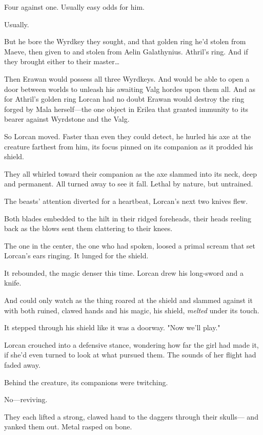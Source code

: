 Four against one. Usually easy odds for him.

Usually.

But he bore the Wyrdkey they sought, and that golden ring he'd stolen from Maeve, then given to and stolen from Aelin Galathynius. Athril's ring. And if they brought either to their master\ldots{}

Then Erawan would possess all three Wyrdkeys. And would be able to open a door between worlds to unleash his awaiting Valg hordes upon them all. And as for Athril's golden ring  Lorcan had no doubt Erawan would destroy the ring forged by Mala herself---the one object in Erilea that granted immunity to its bearer against Wyrdstone  and the Valg.

So Lorcan moved. Faster than even they could detect, he hurled his axe at the creature farthest from him, its focus pinned on its companion as it prodded his shield.

They all whirled toward their companion as the axe slammed into its neck, deep and permanent. All turned away to see it fall. Lethal by nature, but untrained.

The beasts' attention diverted for a heartbeat, Lorcan's next two knives flew.

Both blades embedded to the hilt in their ridged foreheads, their heads reeling back as the blows sent them clattering to their knees.

The one in the center, the one who had spoken, loosed a primal scream that set Lorcan's ears ringing. It lunged for the shield.

It rebounded, the magic denser this time. Lorcan drew his long-sword and a knife.

And could only watch as the thing roared at the shield and slammed against it with both ruined, clawed hands  and his magic, his shield, \emph{melted} under its touch.

It stepped through his shield like it was a doorway. "Now we'll play."

Lorcan crouched into a defensive stance, wondering how far the girl had made it, if she'd even turned to look at what pursued them. The sounds of her flight had faded away.

Behind the creature, its companions were twitching.

No---reviving.

They each lifted a strong, clawed hand to the daggers through their skulls--- and yanked them out. Metal rasped on bone.

